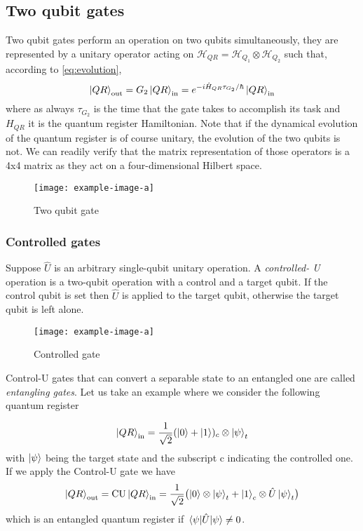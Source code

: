 \subsection{Two qubit gates}
Two qubit gates perform an operation on two qubits simultaneously, they are represented by a unitary operator acting on $\mathcal{H}_{QR} = \mathcal{H}_{Q_1} \otimes \mathcal{H}_{Q_2}$ such that, according to \eqref{eq:evolution},
\begin{equation*}
   \ket{QR}_\textup{out} = G_2\ket{QR}_\textup{in} = e^{-i\hat{H}_{QR} \tau_{G_2}/\hbar}\ket{QR}_\textup{in}
\end{equation*}
where as always $\tau_{G_2}$ is the time that the gate takes to accomplish its task and $H_{QR}$ it is the quantum register Hamiltonian. Note that if the dynamical evolution of the quantum register is of course unitary, the evolution of the two qubits is not.
We can readily verify that the matrix representation of those operators is a 4x4 matrix as they act on a four-dimensional Hilbert space.
\begin{figure}[htb]
\centering
\texttt{[image: example-image-a]}
\caption{Two qubit gate}
\label{fig:two-qubit-gate}
\end{figure}
\subsubsection{Controlled gates}
Suppose $\hat{U}$ is an arbitrary single-qubit unitary operation. A \emph{controlled-
U} operation is a two-qubit operation with a control and a target qubit. If the control
qubit is set then $\hat{U}$ is applied to the target qubit, otherwise the target qubit is left alone.
\begin{figure}[htb]
\centering
\texttt{[image: example-image-a]}
\caption{Controlled gate}
\label{fig:controlled-u}
\end{figure}

Control-U gates that can convert a separable state to an entangled one are called \emph{entangling gates}. Let us take an example where we consider the following quantum register

\begin{equation*}
    \ket{QR}_\textup{in} = \frac{1}{\sqrt2} (\ket{0} + \ket{1})_c \otimes \ket{\psi}_t
\end{equation*}
with $\ket{\psi}$ being the target state and the subscript c indicating the controlled one.
If we apply the Control-U gate we have
\begin{equation}
     \ket{QR}_\textup{out} =\text{CU} \ket{QR}_\textup{in} =  \frac{1}{\sqrt2} \bigl(\ket{0} \otimes \ket{\psi}_t + \ket{1}_c \otimes \hat{U}\ket{\psi}_t\bigr)
\end{equation}
which is an entangled quantum register if $\expval{\hat{U}}{\psi} \neq 0$.
